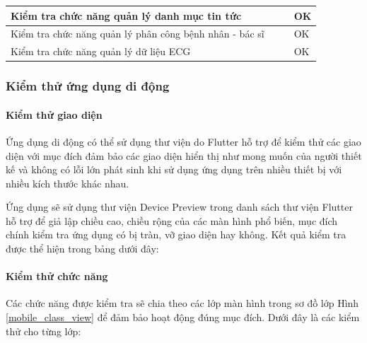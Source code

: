 \begin{xltabular}{\textwidth}{
  | >{\raggedright\arraybackslash}m{2cm}
  | >{\raggedright\arraybackslash}X
  | >{\raggedright\arraybackslash}X
  | >{\raggedright\arraybackslash}m{1cm}|
  }
  \\ \hline

  Kiểm tra chức năng quản lý danh mục tin tức
  & 
 
  & 

  & OK

  \\ \hline

  Kiểm tra chức năng quản lý phân công bệnh nhân - bác sĩ
  & 
 
  & 

  & OK

  \\ \hline

  
  Kiểm tra chức năng quản lý dữ liệu ECG
  & 
 
  & 

  & OK

  \\ \hline

  \end{xltabular}


\subsubsection{Kiểm thử ứng dụng di động}

\paragraph{Kiểm thử giao diện}
\mbox{}

Ứng dụng di động có thể sử dụng thư viện do Flutter hỗ trợ để kiểm thử các giao diện với mục đích
đảm bảo các giao diện hiển thị như mong muốn của người thiết kế và không có lỗi lớn phát sinh khi sử dụng
ứng dụng trên nhiều thiết bị với nhiều kích thước khác nhau.

Ứng dụng sẽ sử dụng thư viện Device Preview trong danh sách thư viện Flutter hỗ trợ để giả lập chiều cao, chiều rộng của
các màn hình phổ biến, mục đích chính kiểm tra ứng dụng có bị tràn, vỡ giao diện hay không. Kết quả kiểm tra được thể hiện
trong bảng dưới đây: 


\paragraph{Kiểm thử chức năng}
\mbox{}
Các chức năng được kiểm tra sẽ chia theo các lớp màn hình trong sơ đồ lớp Hình \ref{mobile_class_view} để đảm bảo hoạt động đúng mục đích. 
Dưới đây là các kiểm thử cho từng lớp:

